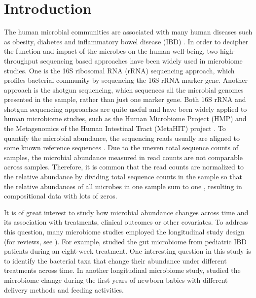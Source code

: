 \section{Introduction}
The human microbial communities are associated with many human diseases such as obesity, diabetes and inflammatory bowel disease (IBD) \citep{turnbaugh2006obesity, qin2012metagenome, Kostic:2015bh}. In order to decipher the function and impact of the microbes on the human well-being, two high-throughput sequencing based approaches have been widely used in microbiome studies. One is the 16S ribosomal RNA (rRNA) sequencing approach, which profiles bacterial community by sequencing the 16S rRNA marker gene. Another approach is the shotgun sequencing, which sequences all the microbial genomes presented in the sample, rather than just one marker gene. Both 16S rRNA and shotgun sequencing approaches are quite useful and have been widely applied to human microbiome studies, such as the Human Microbiome Project (HMP) \citep{turnbaugh2007human} and the Metagenomics of the Human Intestinal Tract (MetaHIT) project \citep{qin2010human}. To quantify the microbial abundance, the sequencing reads usually are aligned to some known reference sequences \citep{segata2012metagenomic}. Due to the uneven total sequence counts of samples, the microbial abundance measured in read counts are not comparable across samples. Therefore, it is common that the read counts are normalized to the relative abundance by dividing total sequence counts in the sample so that the relative abundances of all microbes in one sample sum to one \citep{tyler2014analyzing}, resulting in compositional data with lots of zeros. 


It is of great interest to study how microbial abundance changes across time and its association with treatments, clinical outcomes or other covariates. To address this question, many microbiome studies employed the longitudinal study design (for reviews, see \cite{Faust:2015bd, Gonzalez:2012gv, Gerber:2014ca}). For example, \citet{lewis2015inflammation} studied the gut microbiome from pediatric IBD patients during an eight-week treatment. One interesting question in this study is to identify the bacterial taxa that change their abundance under different treatments across time. In another longitudinal microbiome study, \citet{Backhed:2015kc} studied the microbiome change during the first years of newborn babies with different delivery methods and feeding activities. 


